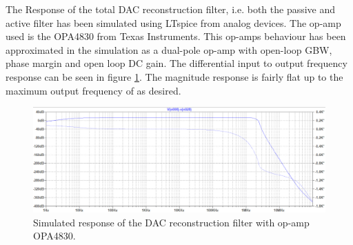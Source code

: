 The Response of the total DAC reconstruction filter, i.e. both the passive and active filter has been simulated using LTspice from analog devices. The op-amp used is the OPA4830 from Texas Instruments. This op-amps behaviour has been approximated in the simulation as a dual-pole op-amp with  open-loop GBW,  phase margin and  open loop DC gain. The differential input to output frequency response can be seen in figure \ref{fig_7_1_1_DAC_SIM_RESPONSE}. The magnitude response is fairly flat up to the maximum output frequency of  as desired.

\begin{figure}[H]
    \centering
    \includegraphics[clip, trim=0 0 0 0, width=1\textwidth]{Sections/7_SystemDesign/Figures/7_1_1_DAC_SIM_FILTER.pdf}
    \caption{Simulated response of the DAC reconstruction filter with op-amp OPA4830.}
    \label{fig_7_1_1_DAC_SIM_RESPONSE}
\end{figure}